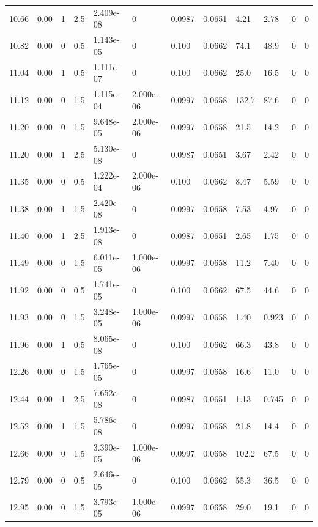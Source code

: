\documentclass[preview]{standalone}
\begin{document}
{{{\begin{tabular}{L{1.2cm}C{1.2cm} C{0.3cm}C{0.5cm} C{1.4cm}C{1.4cm} C{1.4cm}C{1.4cm} C{1.6cm}C{1.6cm} C{1.6cm}C{1.6cm}}
  10.66  &  0.00  & 1     & 2.5 &  2.409e-08  & 0  &  0.0987&   0.0651& 4.21 & 2.78   &  0 & 0  \\ 
  10.82  &  0.00  & 0     & 0.5 &  1.143e-05  & 0  &  0.100&   0.0662& 74.1 & 48.9   &  0 & 0  \\ 
  11.04  &  0.00  & 1     & 0.5 &  1.111e-07  & 0  &  0.100&   0.0662& 25.0 & 16.5   &  0 & 0  \\ 
  11.12  &  0.00  & 0     & 1.5 &  1.115e-04  & 2.000e-06  &  0.0997&   0.0658& 132.7 & 87.6   &  0 & 0  \\ 
  11.20  &  0.00  & 0     & 1.5 &  9.648e-05  & 2.000e-06  &  0.0997&   0.0658& 21.5 & 14.2   &  0 & 0  \\ 
  11.20  &  0.00  & 1     & 2.5 &  5.130e-08  & 0  &  0.0987&   0.0651& 3.67 & 2.42   &  0 & 0  \\ 
  11.35  &  0.00  & 0     & 0.5 &  1.222e-04  & 2.000e-06  &  0.100&   0.0662& 8.47 & 5.59   &  0 & 0  \\ 
  11.38  &  0.00  & 1     & 1.5 &  2.420e-08  & 0  &  0.0997&   0.0658& 7.53 & 4.97   &  0 & 0  \\ 
  11.40  &  0.00  & 1     & 2.5 &  1.913e-08  & 0  &  0.0987&   0.0651& 2.65 & 1.75   &  0 & 0  \\ 
  11.49  &  0.00  & 0     & 1.5 &  6.011e-05  & 1.000e-06  &  0.0997&   0.0658& 11.2 & 7.40   &  0 & 0  \\ 
  11.92  &  0.00  & 0     & 0.5 &  1.741e-05  & 0  &  0.100&   0.0662& 67.5 & 44.6   &  0 & 0  \\ 
  11.93  &  0.00  & 0     & 1.5 &  3.248e-05  & 1.000e-06  &  0.0997&   0.0658& 1.40 & 0.923   &  0 & 0  \\ 
  11.96  &  0.00  & 1     & 0.5 &  8.065e-08  & 0  &  0.100&   0.0662& 66.3 & 43.8   &  0 & 0  \\ 
  12.26  &  0.00  & 0     & 1.5 &  1.765e-05  & 0  &  0.0997&   0.0658& 16.6 & 11.0   &  0 & 0  \\ 
  12.44  &  0.00  & 1     & 2.5 &  7.652e-08  & 0  &  0.0987&   0.0651& 1.13 & 0.745   &  0 & 0  \\ 
  12.52  &  0.00  & 1     & 1.5 &  5.786e-08  & 0  &  0.0997&   0.0658& 21.8 & 14.4   &  0 & 0  \\ 
  12.66  &  0.00  & 0     & 1.5 &  3.390e-05  & 1.000e-06  &  0.0997&   0.0658& 102.2 & 67.5   &  0 & 0  \\ 
  12.79  &  0.00  & 0     & 0.5 &  2.646e-05  & 0  &  0.100&   0.0662& 55.3 & 36.5   &  0 & 0  \\ 
  12.95  &  0.00  & 0     & 1.5 &  3.793e-05  & 1.000e-06  &  0.0997&   0.0658& 29.0 & 19.1   &  0 & 0  \\ 

\end{tabular}}}}
\end{document}
